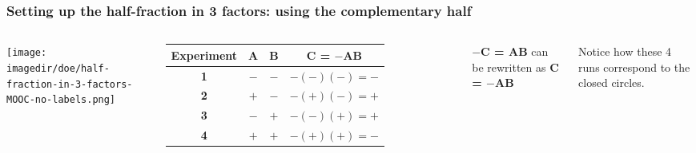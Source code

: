 \begin{frame}\frametitle{Setting up the half-fraction in 3 factors: using the complementary half}
	\begin{columns}
			\begin{center}
				\texttt{[image: \\imagedir/doe/half-fraction-in-3-factors-MOOC-no-labels.png]}
			\end{center}
			
			\begin{tabulary}{\linewidth}{|c||c|c|c|}\hline 
				\textsf{\relax Experiment } & \textbf{\relax A } & \textbf{\relax B } & \textbf{\relax C = $-$AB } \\
				\hline \textbf{1} & \(-\) & \(-\) & \(-(-)(-) = -\) \\
				\hline \textbf{2} & \(+\) & \(-\) & \(-(+)(-) = +\) \\
				\hline \textbf{3} & \(-\) & \(+\) & \(-(-)(+) = +\) \\
				\hline \textbf{4} & \(+\) & \(+\) & \(-(+)(+) = -\) \\
				\hline
			\end{tabulary}
			
			\small
			\vspace{1cm}
			\textbf{\relax $-$C = AB} can be rewritten as \textbf{\relax C = $-$AB}
			
			\vspace{1cm}
			Notice how these 4 runs correspond to the closed circles.
			
	\end{columns}
\end{frame}

